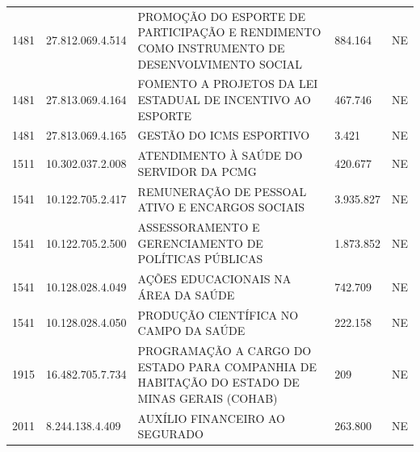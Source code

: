\documentclass{article}
\begin{document}
\begin{longtable}[c]{m{1cm}|m{2cm}|m{10cm}|m{2cm}|m{1cm}}
\multicolumn{1}{C{1cm}|}{1481} & \multicolumn{1}{C{2cm}|}{27.812.069.4.514} & \multicolumn{1}{L{10cm}|}{PROMOÇÃO DO ESPORTE DE PARTICIPAÇÃO E RENDIMENTO COMO INSTRUMENTO DE DESENVOLVIMENTO SOCIAL} & \multicolumn{1}{R{2cm}|}{884.164} & \multicolumn{1}{C{1cm}}{NE} \\
\multicolumn{1}{C{1cm}|}{1481} & \multicolumn{1}{C{2cm}|}{27.813.069.4.164} & \multicolumn{1}{L{10cm}|}{FOMENTO A PROJETOS DA LEI ESTADUAL DE INCENTIVO AO ESPORTE} & \multicolumn{1}{R{2cm}|}{467.746} & \multicolumn{1}{C{1cm}}{NE} \\
\multicolumn{1}{C{1cm}|}{1481} & \multicolumn{1}{C{2cm}|}{27.813.069.4.165} & \multicolumn{1}{L{10cm}|}{GESTÃO DO ICMS ESPORTIVO} & \multicolumn{1}{R{2cm}|}{3.421} & \multicolumn{1}{C{1cm}}{NE} \\
\multicolumn{1}{C{1cm}|}{1511} & \multicolumn{1}{C{2cm}|}{10.302.037.2.008} & \multicolumn{1}{L{10cm}|}{ATENDIMENTO À SAÚDE DO SERVIDOR DA PCMG} & \multicolumn{1}{R{2cm}|}{420.677} & \multicolumn{1}{C{1cm}}{NE} \\
\multicolumn{1}{C{1cm}|}{1541} & \multicolumn{1}{C{2cm}|}{10.122.705.2.417} & \multicolumn{1}{L{10cm}|}{REMUNERAÇÃO DE PESSOAL ATIVO E ENCARGOS SOCIAIS} & \multicolumn{1}{R{2cm}|}{3.935.827} & \multicolumn{1}{C{1cm}}{NE} \\
\multicolumn{1}{C{1cm}|}{1541} & \multicolumn{1}{C{2cm}|}{10.122.705.2.500} & \multicolumn{1}{L{10cm}|}{ASSESSORAMENTO E GERENCIAMENTO DE POLÍTICAS PÚBLICAS} & \multicolumn{1}{R{2cm}|}{1.873.852} & \multicolumn{1}{C{1cm}}{NE} \\
\multicolumn{1}{C{1cm}|}{1541} & \multicolumn{1}{C{2cm}|}{10.128.028.4.049} & \multicolumn{1}{L{10cm}|}{AÇÕES EDUCACIONAIS NA ÁREA DA SAÚDE} & \multicolumn{1}{R{2cm}|}{742.709} & \multicolumn{1}{C{1cm}}{NE} \\
\multicolumn{1}{C{1cm}|}{1541} & \multicolumn{1}{C{2cm}|}{10.128.028.4.050} & \multicolumn{1}{L{10cm}|}{PRODUÇÃO CIENTÍFICA NO CAMPO DA SAÚDE} & \multicolumn{1}{R{2cm}|}{222.158} & \multicolumn{1}{C{1cm}}{NE} \\
\multicolumn{1}{C{1cm}|}{1915} & \multicolumn{1}{C{2cm}|}{16.482.705.7.734} & \multicolumn{1}{L{10cm}|}{PROGRAMAÇÃO A CARGO DO ESTADO PARA COMPANHIA DE HABITAÇÃO DO ESTADO DE MINAS GERAIS (COHAB)} & \multicolumn{1}{R{2cm}|}{209} & \multicolumn{1}{C{1cm}}{NE} \\
\multicolumn{1}{C{1cm}|}{2011} & \multicolumn{1}{C{2cm}|}{8.244.138.4.409} & \multicolumn{1}{L{10cm}|}{AUXÍLIO FINANCEIRO AO SEGURADO} & \multicolumn{1}{R{2cm}|}{263.800} & \multicolumn{1}{C{1cm}}{NE} \\

\end{longtable}
\end{document}
